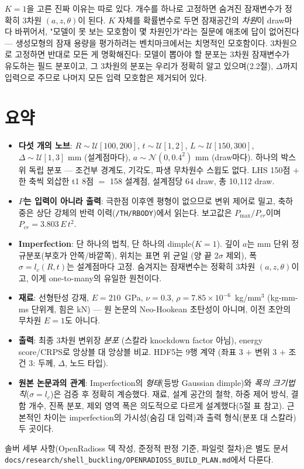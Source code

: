 \documentclass[11pt]{article}
\begin{document}
$K{=}1$을 고른 진짜 이유는 따로 있다. 개수를 하나로 고정하면 숨겨진
잠재변수가 정확히 3차원 $(a, z, \theta)$이 된다. $K$ 자체를 확률변수로 두면
잠재공간의 \emph{차원}이 draw마다 바뀌어서, "모델이 못 보는 모호함이 몇
차원인가"라는 질문에 애초에 답이 없어진다 --- 생성모형의 잠재 용량을
평가하려는 벤치마크에서는 치명적인 모호함이다. 3차원으로 고정하면 반대로
모든 게 명확해진다: 모델이 뽑아야 할 분포는 3차원 잠재변수가 유도하는
필드 분포이고, 그 3차원의 분포는 우리가 정확히 알고 있으며(2.2절),
$\Delta$까지 입력으로 주므로 나머지 모든 입력 모호함은 제거되어 있다.

\section{요약}

\begin{itemize}
\item \textbf{다섯 개의 노브}: $R\!\sim\!\mathcal{U}[100,200]$,
      $t\!\sim\!\mathcal{U}[1,2]$, $L\!\sim\!\mathcal{U}[150,300]$,
      $\Delta\!\sim\!\mathcal{U}[1,3]$ mm (설계점마다), $a\!\sim\!\mathcal{N}(0,0.4^2)$
      mm (draw마다). 하나의 박스 위 독립 분포 --- 조건부 경계도, 기각도,
      파생 무차원수 스윕도 없다. LHS 150점 $+$ 한 축씩 외삽한 t1 8점
      $=$ 158 설계점, 설계점당 64 draw, 총 10{,}112 draw.
\item \textbf{$P$는 입력이 아니라 출력}: 극한점 이후엔 평형이 없으므로 변위
      제어로 밀고, 축하중은 상단 강체의 반력 이력(\texttt{/TH/RBODY})에서
      읽는다. 보고값은 $P_{\max}/P_{cr}$이며 $P_{cr}=3.803\,E\,t^2$.
\item \textbf{Imperfection}: 단 하나의 법칙, 단 하나의 dimple($K{=}1$).
      깊이 $a$는 mm 단위 정규분포(부호가 안쪽/바깥쪽), 위치는 표면 위 균일
      (양 끝 $2\sigma$ 제외), 폭 $\sigma=l_c(R,t)$는 설계점마다 고정.
      숨겨지는 잠재변수는 정확히 3차원 $(a,z,\theta)$이고, 이게
      one-to-many의 유일한 원천이다.
\item \textbf{재료}: 선형탄성 강재, $E{=}210$~GPa, $\nu{=}0.3$,
      $\rho{=}7.85\times10^{-6}$~kg/mm$^3$ (kg-mm-ms 단위계, 힘은 kN) ---
      원 논문의 Neo-Hookean 초탄성이 아니며, 이전 초안의 무차원 $E{=}1$도
      아니다.
\item \textbf{출력}: 최종 3차원 변위장 \emph{분포} (스칼라 knockdown factor 아님),
      energy score/CRPS로 앙상블 대 앙상블 비교. HDF5는 9행 계약
      (좌표 3 $+$ 변위 3 $+$ 조건 3: 두께, $\Delta$, 노드 타입).
\item \textbf{원본 논문과의 관계}: Imperfection의 \emph{형태}(등방 Gaussian
      dimple)와 \emph{폭의 크기법칙}($\sigma=l_c$)은 검증 후 정확히 계승했다.
      재료, 설계 공간의 철학, 하중 제어 방식, 결함 개수, 진폭 분포, 제외
      영역 폭은 의도적으로 다르게 설계했다(5절 표 참고). 근본적인 차이는
      imperfection의 가시성(숨김 대 입력)과 출력 형식(분포 대 스칼라) 두
      곳이다.
\end{itemize}

솔버 세부 사항(OpenRadioss 덱 작성, 준정적 판정 기준, 파일럿 절차)은 별도 문서
\texttt{docs/research/shell\_buckling/OPENRADIOSS\_BUILD\_PLAN.md}에서 다룬다.
\end{document}
